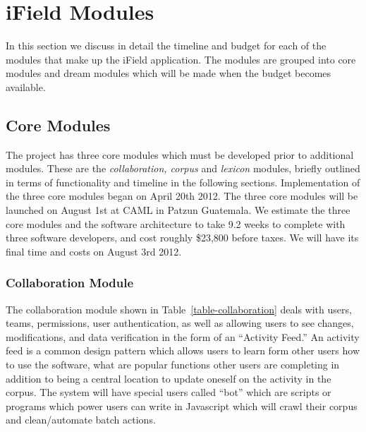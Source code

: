 \documentclass[12 pt]{article}
\begin{document}
\section{iField Modules}

In this section we discuss in detail the timeline and budget for each of the modules that make up the iField application. The modules are grouped into core modules and dream modules which will be made when the budget becomes available. 

\label{sec:modules}
\subsection{Core Modules}

The project has three core modules which must be developed prior to additional modules. These are the {\it collaboration, corpus} and {\it lexicon} modules, briefly outlined in terms of functionality and timeline in the following sections.  Implementation of the three core modules began on April 20th 2012. The three core modules will be launched on August 1st at CAML in Patzun Guatemala. We estimate the three core modules and the software architecture to take 9.2 weeks to complete with three software developers,  and cost roughly \$23,800 before taxes. We will have its final time and costs on August 3rd 2012.


\newpage
\subsubsection{Collaboration Module}
The collaboration module shown in Table~\ref{table-collaboration}  deals with users, teams, permissions, user authentication,  as well as allowing users to see changes, modifications, and data verification in the form of an ``Activity Feed.'' An activity feed is a common design pattern which allows users to learn form other users how to use the software, what are popular functions other users are completing in addition to being a central location to update oneself on the activity in the corpus. The system will have special users called ``bot'' which are scripts or programs which power users can write in Javascript which will crawl their corpus and clean/automate batch actions.
\end{document}
